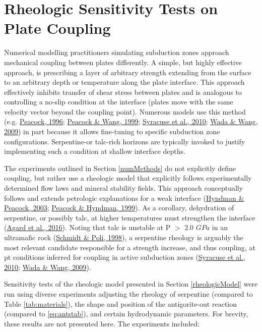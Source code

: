 \hypertarget{rheologicSensitivity}{%
\section{Rheologic Sensitivity Tests on Plate Coupling}\label{rheologicSensitivity}}

Numerical modelling practitioners simulating subduction zones approach mechanical coupling between plates differently. A simple, but highly effective approach, is prescribing a layer of arbitrary strength extending from the surface to an arbitrary depth or temperature along the plate interface. This approach effectively inhibits transfer of shear stress between plates and is analogous to controlling a no-slip condition at the interface (plates move with the same velocity vector beyond the coupling point). Numerous models use this method (e.g. \protect\hyperlink{ref-peacock1996}{Peacock, 1996}; \protect\hyperlink{ref-peacock1999b}{Peacock \& Wang, 1999}; \protect\hyperlink{ref-syracuse2010}{Syracuse et al., 2010}; \protect\hyperlink{ref-wada2009}{Wada \& Wang, 2009}) in part because it allows fine-tuning to specific subduction zone configurations. Serpentine-or talc-rich horizons are typically invoked to justify implementing such a condition at shallow interface depths.

The experiments outlined in Section \ref{numMethods} do not explicitly define coupling, but rather use a rheologic model that explicitly follows experimentally determined flow laws and mineral stability fields. This approach conceptually follows and extends petrologic explanations for a weak interface (\protect\hyperlink{ref-hyndman2003}{Hyndman \& Peacock, 2003}; \protect\hyperlink{ref-peacock1999a}{Peacock \& Hyndman, 1999}). As a corollary, dehydration of serpentine, or possibly talc, at higher temperatures must strengthen the interface (\protect\hyperlink{ref-agard2016}{Agard et al., 2016}). Noting that talc is unstable at P \(>\) 2.0 \(GPa\) in an ultramafic rock (\protect\hyperlink{ref-schmidt1998}{Schmidt \& Poli, 1998}), a serpentine rheology is arguably the most relevant candidate responsible for a strength increase, and thus coupling, at \gls{pt} conditions inferred for coupling in active subduction zones (\protect\hyperlink{ref-syracuse2010}{Syracuse et al., 2010}; \protect\hyperlink{ref-wada2009}{Wada \& Wang, 2009}).

Sensitivity tests of the rheologic model presented in Section \ref{rheologicModel} were run using diverse experiments adjusting the rheology of serpentine (compared to Table \ref{tab:materials}), the shape and position of the antigorite-out reaction (compared to \eqref{eq:antstab}), and certain hydrodynamic parameters. For brevity, these results are not presented here. The experiments included:

